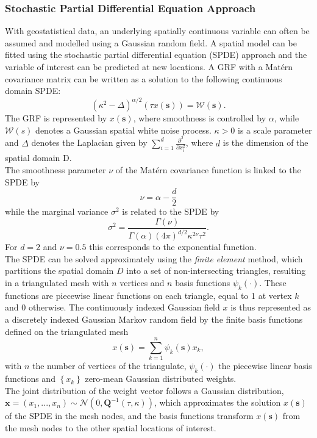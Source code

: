 \subsubsection{Stochastic Partial Differential Equation Approach}
With geostatistical data, an underlying spatially continuous variable can often be assumed and modelled using a Gaussian random field. A spatial model can be fitted using the stochastic partial differential equation (SPDE) approach and the variable of interest can be predicted at new locations. A GRF with a Matérn covariance matrix can be written as a solution to the following continuous domain SPDE:
\begin{equation}
    \left(\kappa^2-\Delta\right)^{\alpha/2}\left(\tau x\left(\pmb{s}\right)\right) = \mathcal{W}\left(\pmb{s}\right).
\end{equation}
The GRF is represented by $x\left(\pmb{s}\right)$, where smoothness is controlled by $\alpha$, while $\mathcal{W}\left(s\right)$ denotes a Gaussian spatial white noise process. $\kappa>0$ is a scale parameter and $\Delta$ denotes the Laplacian given by $\sum_{i=1}^d\frac{\partial^2}{\partial x_i^2}$, where $d$ is the dimension of the spatial domain D. \\
The smoothness parameter $\nu$ of the Matérn covariance function is linked to the SPDE by
\begin{equation*}
    \nu=\alpha-\frac{d}{2}
\end{equation*}
while the marginal variance $\sigma^2$ is related to the SPDE by
\begin{equation*}
    \sigma^2=\frac{\Gamma\left(\nu\right)}{\Gamma\left(\alpha\right)\left(4\pi\right)^{d/2}\kappa^{2\nu}\tau^2}.
\end{equation*}
For $d=2$ and $\nu=0.5$ this corresponds to the exponential function. \\
The SPDE can be solved approximately using the \textit{finite element} method, which partitions the spatial domain $D$ into a set of non-intersecting triangles, resulting in a triangulated mesh with $n$ vertices and $n$ basis functions $\psi_k\left(\cdot\right)$. These functions are piecewise linear functions on each triangle, equal to 1 at vertex $k$ and 0 otherwise. The continuously indexed Gaussian field $x$ is thus represented as a discretely indexed Gaussian Markov random field by the finite basis functions defined on the triangulated mesh
\begin{equation}
    x\left(\pmb{s}\right)=\sum_{k=1}^n\psi_k\left(\pmb{s}\right)x_k,
\end{equation}
with $n$ the number of vertices of the triangulate, $\psi_k\left(\cdot\right)$ the piecewise linear basis functions and $\left\lbrace x_k\right\rbrace$ zero-mean Gaussian distributed weights. \\
The joint distribution of the weight vector follows a Gaussian distribution, $\pmb{x}=\left(x_1,... ,x_n\right)\sim\mathcal{N}\left(0, \pmb{Q}^{-1}\left(\tau, \kappa\right)\right)$, which approximates the solution $x\left(\pmb{s}\right)$ of the SPDE in the mesh nodes, and the basis functions transform $x\left(\pmb{s}\right)$ from the mesh nodes to the other spatial locations of interest\autocite[Cf.][]{moraga2019geospatial}.